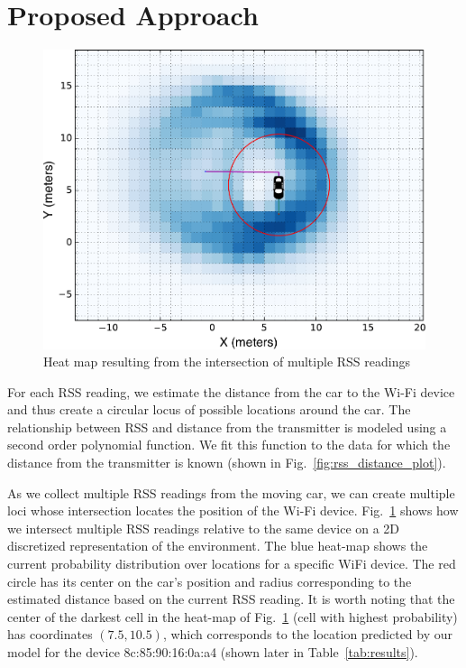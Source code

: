 \documentclass{article}
\begin{document}
\section{Proposed Approach}
\vspace{-.3cm}
\begin{figure}
    \centering
    \vspace{-20pt}
    \includegraphics[width=\linewidth]{figures/moving_car.pdf}
    \caption{Heat map resulting from the intersection of multiple RSS readings \label{fig:moving_car}}
    \vspace{-20pt}
\end{figure}
For each RSS reading, we estimate the distance from the car to the Wi-Fi device and thus create a 
circular locus of possible locations around the car. The relationship between RSS and distance
from the transmitter is modeled using a second order polynomial function. We fit this function to the 
data for which the distance from the transmitter is known (shown in Fig.~\ref{fig:rss_distance_plot}).

As we collect multiple RSS readings from the moving car, we can create multiple loci whose 
intersection locates the position of the Wi-Fi device.
Fig.~\ref{fig:moving_car} shows how we intersect multiple RSS readings relative to the same device
on a 2D discretized representation of the environment. The blue heat-map shows the current 
probability distribution over locations for a specific WiFi device. The red circle has its center on the
car's position and radius corresponding to the estimated distance based on the current RSS reading. 
It is worth noting that the center of the darkest cell in the heat-map of Fig.~\ref{fig:moving_car}
(cell with highest probability) has coordinates $(7.5, 10.5)$, which corresponds to the location 
predicted by our model for the device 8c:85:90:16:0a:a4 (shown later in Table~\ref{tab:results}).
\end{document}
